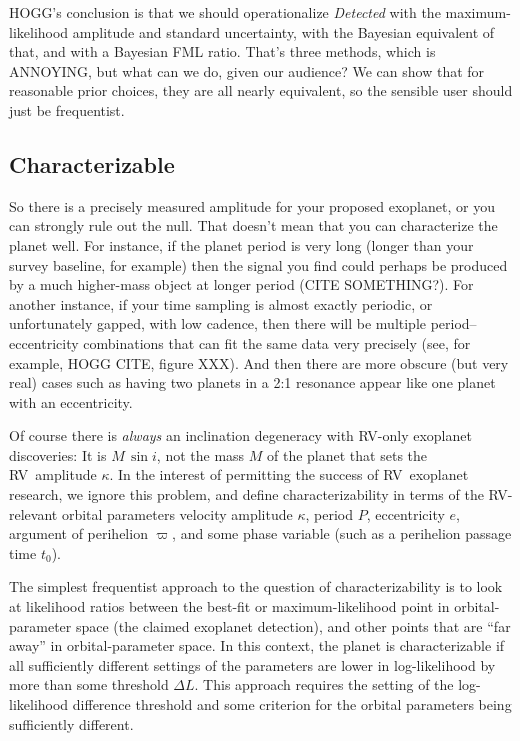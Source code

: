 \documentclass[modern]{aastex63}
\newcommand{\acronym}[1]{{\small{#1}}}
\newcommand{\rv}{\acronym{RV}}
\begin{document}
HOGG's conclusion is that we should operationalize \textsl{Detected}
with the maximum-likelihood amplitude and standard uncertainty, with
the Bayesian equivalent of that, and with a Bayesian FML ratio. That's
three methods, which is ANNOYING, but what can we do, given our
audience?  We can show that for reasonable prior choices, they are all
nearly equivalent, so the sensible user should just be frequentist.

\subsection{Characterizable}

So there is a precisely measured amplitude for your proposed exoplanet,
or you can strongly rule out the null.
That doesn't mean that you can characterize the planet well.
For instance, if the planet period is very long (longer than your
survey baseline, for example) then the signal you find could perhaps
be produced by a much higher-mass object at longer period (CITE SOMETHING?).
For another instance, if your time sampling is almost exactly
periodic, or unfortunately gapped, with low cadence, then there will
be multiple period--eccentricity combinations that can fit the same
data very precisely (see, for example, HOGG CITE, figure XXX).
And then there are more obscure (but very real) cases such as having two
planets in a 2:1 resonance appear like one planet with an eccentricity.

Of course there is \emph{always} an inclination degeneracy with \rv-only
exoplanet discoveries: It is $M\,\sin i$, not the mass $M$ of the planet
that sets the \rv\ amplitude $\kappa$.
In the interest of permitting the success of \rv\ exoplanet research,
we ignore this problem, and define characterizability in terms of
the \rv-relevant orbital parameters velocity amplitude $\kappa$,
period $P$, eccentricity $e$, argument of perihelion $\varpi$, and
some phase variable (such as a perihelion passage time $t_0$).

The simplest frequentist approach to the question of
characterizability is to look at likelihood ratios between the
best-fit or maximum-likelihood point in orbital-parameter space (the
claimed exoplanet detection), and other points that are ``far away''
in orbital-parameter space.
In this context, the planet is characterizable if all sufficiently
different settings of the parameters are lower in log-likelihood by
more than some threshold $\Delta L$.
This approach requires the setting of the log-likelihood difference
threshold and some criterion for the orbital parameters being
sufficiently different.
\end{document}
